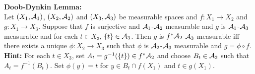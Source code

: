 \documentclass{book}
\begin{document}
	\begin{ex}  \textbf{Doob-Dynkin Lemma:} \\
		Let $(X_1, \mathcal{A}_1)$, $(X_2, \mathcal{A}_2)$ and $(X_3, \mathcal{A}_3)$ be measurable spaces and $f: X_1 \rightarrow X_2$ and $g:X_1 \rightarrow X_3$. Suppose that $f$ is surjective and $\mathcal{A}_1$-$\mathcal{A}_2$ measurable and $g$ is $\mathcal{A}_1$-$\mathcal{A}_3$ measurable and for each $t \in X_3$, $\{t\} \in \mathcal{A}_3$. Then $g$ is $f^*\mathcal{A}_2$-$\mathcal{A}_3$ measurable iff there exists a unique $\phi: X_2 \rightarrow X_3$ such that $\phi$ is $\mathcal{A}_2$-$\mathcal{A}_3$ measurable and $g = \phi \circ f$. \\
		\textbf{Hint:} For each $t \in X_3$, set $A_t = g^{-1}(\{t\}) \in f^* \mathcal{A}_2$ and choose $B_t \in \mathcal{A}_2$ such that $A_t = f^{-1}(B_t)$. Set $\phi(y) = t$ for $y \in B_t \cap f(X_1)$ and $t \in g(X_1)$.
	\end{ex}
	
\end{document}
